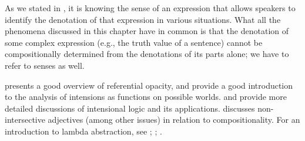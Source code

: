 As we stated in , it is knowing the sense of an expression that allows speakers to identify the denotation of that expression in various situations. What all the phenomena discussed in this chapter have in common is that the denotation of some complex expression (e.g., the truth value of a sentence) cannot be compositionally determined from the denotations of its parts alone; we have to refer to senses as well.



\furtherreading



\citet[ch. 7]{Kearns2011} presents a good overview of referential opacity, and \citet[ch. 8]{ZimmermannSternefeld2013} provide a good introduction to the analysis of intensions as functions on possible worlds.   and \citet{Gamut1991b} provide more detailed discussions of intensional logic and its applications. \citet{Partee1995} discusses non-intersective adjectives (among other issues) in relation to compositionality. For an introduction to lambda abstraction, see 
\citet[93ff.]{Coppock2016};
\citet[62–75]{Kearns2011};
\citet[34ff.]{HeimKratzer1998}.